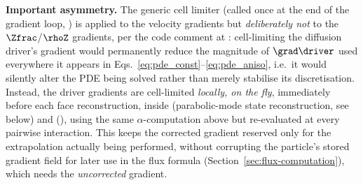 \textbf{Important asymmetry.} The generic cell limiter
 (called once at the end of the
gradient loop, ) is applied to the
velocity gradients but \emph{deliberately not} to the $\Zfrac$/$\rhoZ$
gradients, per the code comment at
: cell-limiting the
diffusion driver's gradient would permanently reduce the magnitude of
$\grad\driver$ used everywhere it appears in
Eqs.~\eqref{eq:pde_const}--\eqref{eq:pde_aniso}, i.e.\ it would silently
alter the PDE being solved rather than merely stabilise its
discretisation. Instead, the driver gradients are cell-limited
\emph{locally, on the fly}, immediately before each face reconstruction,
inside 
(parabolic-mode state reconstruction, see below) and
(), using the same
$\alpha$-computation above but re-evaluated at every pairwise
interaction. This keeps the corrected gradient reserved only for the
extrapolation actually being performed, without corrupting the
particle's stored gradient field for later use in the flux formula
(Section~\ref{sec:flux-computation}), which needs the \emph{uncorrected}
gradient.

